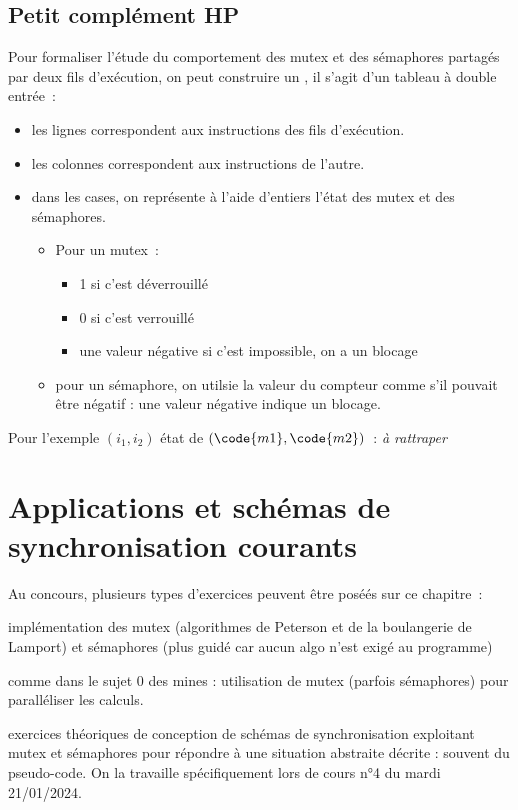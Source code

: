 \begin{adjustwidth}{-3cm}{-3cm}
\subsection{Petit complément HP}

Pour formaliser l'étude du comportement des mutex et des sémaphores partagés par deux fils d'exécution, on peut construire un , il s'agit d'un tableau à double entrée~:
\begin{itemize}
    \item les lignes correspondent aux instructions des fils d'exécution.
    \item les colonnes correspondent aux instructions de l'autre.
    \item dans les cases, on représente à l'aide d'entiers l'état des mutex et des sémaphores. 
    \begin{itemize}
        \item Pour un mutex~:
        \begin{itemize}
            \item 1 si c'est déverrouillé
            \item 0 si c'est verrouillé
            \item une valeur négative si c'est impossible, on a un blocage
        \end{itemize}
        \item pour un sémaphore, on utilsie la valeur du compteur comme s'il pouvait être négatif : une valeur négative indique un blocage.
    \end{itemize}
\end{itemize}
Pour l'exemple $(i_1, i_2)$ état de $(\code{m1}, \code{m2})$~:
\textit{à rattraper}
\section{Applications et schémas de synchronisation courants}
Au concours, plusieurs types d'exercices peuvent être poséés sur ce chapitre~:
\begin{enumeratebf}
    \item implémentation des mutex (algorithmes de Peterson et de la boulangerie de Lamport) et sémaphores (plus guidé car aucun algo n'est exigé au programme)
    \item comme dans le sujet 0 des mines : utilisation de mutex (parfois sémaphores) pour paralléliser les calculs.
    \item exercices théoriques de conception de schémas de synchronisation exploitant mutex et sémaphores pour répondre à une situation abstraite décrite : souvent du pseudo-code. On la travaille spécifiquement lors de cours n°4 du mardi 21/01/2024.
\end{enumeratebf}


\end{adjustwidth}
